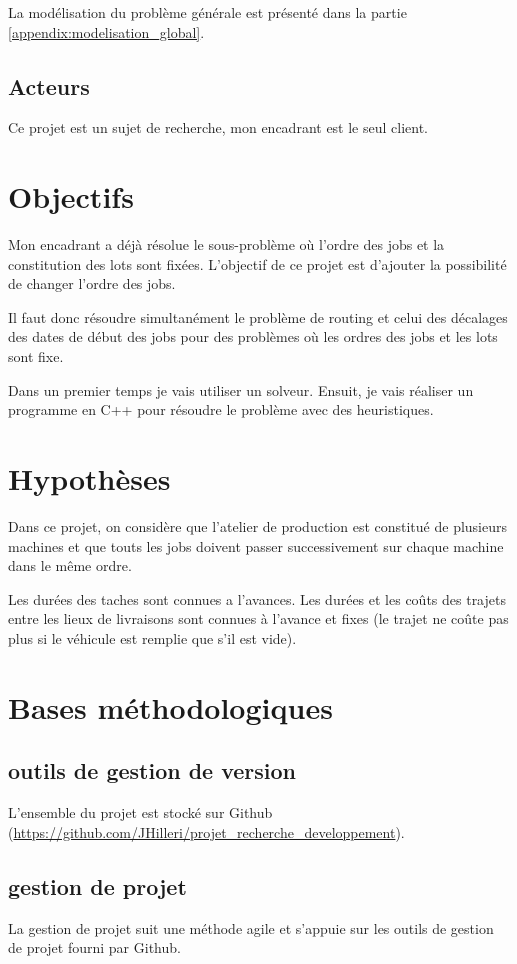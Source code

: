 La modélisation du problème générale est présenté dans la partie \autoref{appendix:modelisation_global}.

\subsection{Acteurs}
Ce projet est un sujet de recherche, mon encadrant est le seul client.

\section{Objectifs}
Mon encadrant a déjà résolue le sous-problème où l'ordre des jobs et la constitution des lots sont fixées.
L'objectif de ce projet est d'ajouter la possibilité de changer l'ordre des jobs.

Il faut donc résoudre simultanément le problème de routing et celui des décalages des dates de début des jobs 
    pour des problèmes où les ordres des jobs et les lots sont fixe.

Dans un premier temps je vais utiliser un solveur.
Ensuit, je vais réaliser un programme en C++ pour résoudre le problème avec des heuristiques.

\section{Hypothèses}
Dans ce projet, on considère que l'atelier de production est constitué de plusieurs machines 
    et que touts les jobs doivent passer successivement sur chaque machine dans le même ordre.

Les durées des taches sont connues a l'avances.
Les durées et les coûts des trajets entre les lieux de livraisons sont connues à l'avance 
    et fixes (le trajet ne coûte pas plus si le véhicule est remplie que s'il est vide).


\section{Bases méthodologiques}
\subsection{outils de gestion de version}
L'ensemble du projet est stocké sur Github (\url{https://github.com/JHilleri/projet_recherche_developpement}).

\subsection{gestion de projet}
La gestion de projet suit une méthode agile et s'appuie sur les outils de gestion de projet fourni par Github.

